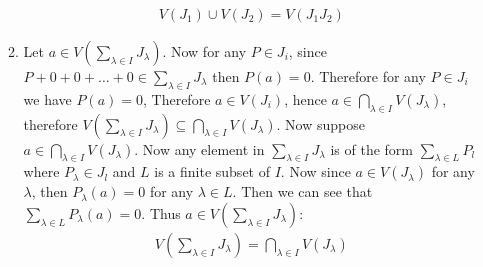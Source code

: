 \begin{enumerate}[label=\ilabel]
\begin{enumerate}
                \begin{gather*}
                    V(J_1) \cup V(J_2) = V(J_1J_2)
                \end{gather*}
            \item
                Let $a \in V(\sum_{\lambda \in I} J_\lambda)$. Now for any $P \in J_i$, since $P + 0 + 0 + \dots + 0 \in \sum_{\lambda \in I} J_\lambda$ then $P(a) = 0$. Therefore for any $P \in J_i$ we have $P(a) = 0$, Therefore $a \in V(J_i)$, hence $a \in \bigcap_{\lambda \in I} V(J_\lambda)$, therefore $V(\sum_{\lambda \in I} J_\lambda ) \subseteq \bigcap_{\lambda \in I} V(J_\lambda)$.
                Now suppose $a \in \bigcap_{\lambda \in I} V(J_\lambda)$. Now any element in $\sum_{\lambda \in I} J_\lambda$ is of the form $\sum_{\lambda \in L} P_l$ where $P_\lambda \in J_l$ and $L$ is a finite subset of $I$. Now since $a \in V(J_\lambda)$ for any $\lambda$, then $P_\lambda(a) = 0$ for any $\lambda \in L$. Then we can see that $\sum_{\lambda \in L} P_\lambda(a) = 0$. Thus $a \in V(\sum_{\lambda \in I} J_\lambda)$:
                \begin{gather*}
                    V(\sum_{\lambda \in I} J_\lambda) = \bigcap_{\lambda \in I} V(J_\lambda)
                \end{gather*}
        \end{enumerate}
\end{enumerate}